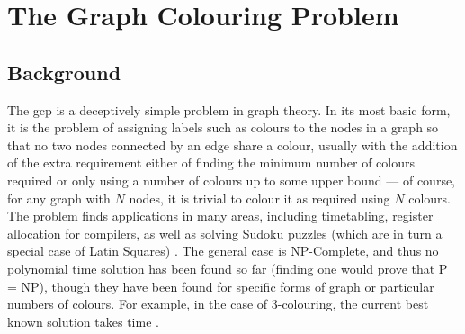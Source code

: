 \newcommand{\bo}{\(b\)}

\chapter{\label{chap:gcol}The Graph Colouring Problem}

\section{\label{sec:gcol:background}Background}

The \gls{gcp} is a deceptively simple problem in graph theory.  In its most basic form, it is the problem of assigning labels such as colours to the nodes in a graph so that no two nodes connected by an edge share a colour, usually with the addition of the extra requirement either of finding the minimum number of colours required or only using a number of colours up to some upper bound --- of course, for any graph with \(N\) nodes, it is trivial to colour it as required using \(N\) colours.  The problem finds applications in many areas, including timetabling, register allocation for compilers, as well as solving Sudoku puzzles (which are in turn a special case of Latin Squares) \cite{Lewis2016}.  The general case is NP-Complete, and thus no polynomial time solution has been found so far (finding one would prove that P = NP), though they have been found for specific forms of graph or particular numbers of colours.  For example, in the case of 3-colouring, the current best known solution takes  time \cite{Beigel2005}.



